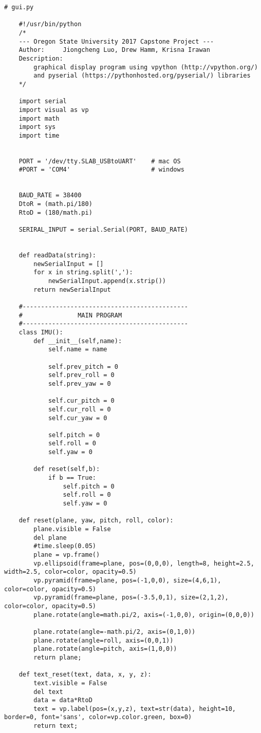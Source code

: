 	\begin{lstlisting}
# gui.py

	#!/usr/bin/python
	/*
	---	Oregon State University 2017 Capstone Project ---
	Author:		Jiongcheng Luo, Drew Hamm, Krisna Irawan
	Description:
		graphical display program using vpython (http://vpython.org/)
		and pyserial (https://pythonhosted.org/pyserial/) libraries
	*/

	import serial
	import visual as vp
	import math
	import sys
	import time 


	PORT = '/dev/tty.SLAB_USBtoUART'	# mac OS
	#PORT = 'COM4'						# windows


	BAUD_RATE = 38400
	DtoR = (math.pi/180)
	RtoD = (180/math.pi)

	SERIRAL_INPUT = serial.Serial(PORT, BAUD_RATE)


	def readData(string):
		newSerialInput = []
		for x in string.split(','):
			newSerialInput.append(x.strip())
		return newSerialInput

	#---------------------------------------------
	#				MAIN PROGRAM
	#---------------------------------------------
	class IMU():
		def __init__(self,name):
			self.name = name

			self.prev_pitch = 0
			self.prev_roll = 0
			self.prev_yaw = 0

			self.cur_pitch = 0		
			self.cur_roll = 0
			self.cur_yaw = 0

			self.pitch = 0		
			self.roll = 0
			self.yaw = 0

		def reset(self,b):
			if b == True:
				self.pitch = 0		
				self.roll = 0
				self.yaw = 0

	def reset(plane, yaw, pitch, roll, color):
		plane.visible = False
		del plane
		#time.sleep(0.05)
		plane = vp.frame()
		vp.ellipsoid(frame=plane, pos=(0,0,0), length=8, height=2.5, width=2.5, color=color, opacity=0.5)
		vp.pyramid(frame=plane, pos=(-1,0,0), size=(4,6,1), color=color, opacity=0.5)
		vp.pyramid(frame=plane, pos=(-3.5,0,1), size=(2,1,2), color=color, opacity=0.5)
		plane.rotate(angle=math.pi/2, axis=(-1,0,0), origin=(0,0,0))
		
		plane.rotate(angle=-math.pi/2, axis=(0,1,0))	
		plane.rotate(angle=roll, axis=(0,0,1))		
		plane.rotate(angle=pitch, axis=(1,0,0))	
		return plane;

	def text_reset(text, data, x, y, z):
		text.visible = False
		del text
		data = data*RtoD
		text = vp.label(pos=(x,y,z), text=str(data), height=10, border=0, font='sans', color=vp.color.green, box=0)
		return text; 		
		

\end{lstlisting}
